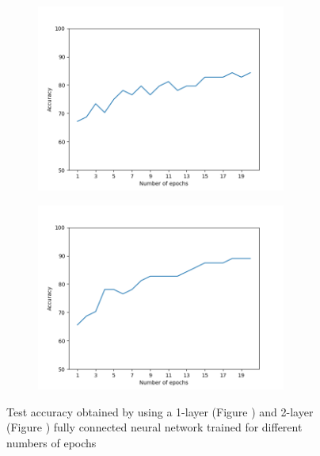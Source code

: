 \documentclass[12pt]{article}
\begin{document}
\begin{figure}[h]
	\begin{subfigure}{0.6\textwidth}
		\includegraphics[width = 0.9\textwidth]{ex3_FCNN1l_accuracy-epochs.png}
		\caption{}
		\label{subfig:FCNN1l_accuracy-epochs}
	\end{subfigure}
	\begin{subfigure}{0.6\textwidth}
		\includegraphics[width = 0.9\textwidth]{ex3_FCNN2l_accuracy-epochs.png}
		\caption{}
		\label{subfig:FCNN2l_accuracy-epochs}
	\end{subfigure}
	\caption{Test accuracy obtained by using a 1-layer (Figure ) and 2-layer (Figure ) fully connected neural network trained for different numbers of epochs}
	\label{fig:ex3_FCNN_epochs}
\end{figure}
\end{document}
